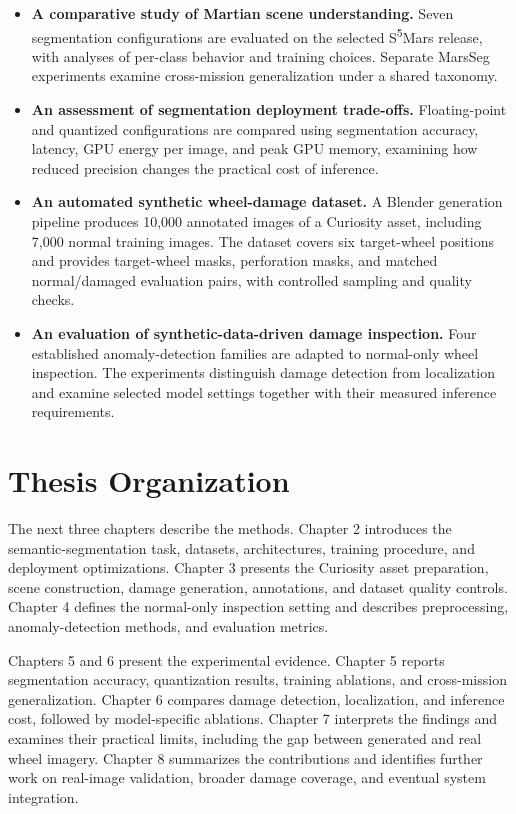 \begin{itemize}
    \item \textbf{A comparative study of Martian scene understanding.} Seven segmentation configurations are evaluated on the selected S\textsuperscript{5}Mars release, with analyses of per-class behavior and training choices. Separate MarsSeg experiments examine cross-mission generalization under a shared taxonomy.
    \item \textbf{An assessment of segmentation deployment trade-offs.} Floating-point and quantized configurations are compared using segmentation accuracy, latency, GPU energy per image, and peak GPU memory, examining how reduced precision changes the practical cost of inference.
    \item \textbf{An automated synthetic wheel-damage dataset.} A Blender generation pipeline produces 10,000 annotated images of a Curiosity asset, including 7,000 normal training images. The dataset covers six target-wheel positions and provides target-wheel masks, perforation masks, and matched normal/damaged evaluation pairs, with controlled sampling and quality checks.
    \item \textbf{An evaluation of synthetic-data-driven damage inspection.} Four established anomaly-detection families are adapted to normal-only wheel inspection. The experiments distinguish damage detection from localization and examine selected model settings together with their measured inference requirements.
\end{itemize}

\section{Thesis Organization}

The next three chapters describe the methods. Chapter 2  introduces the semantic-segmentation task, datasets, architectures, training procedure, and deployment optimizations. Chapter 3 presents the Curiosity asset preparation, scene construction, damage generation, annotations, and dataset quality controls. Chapter 4 defines the normal-only inspection setting and describes preprocessing, anomaly-detection methods, and evaluation metrics.

Chapters 5 and 6 present the experimental evidence. Chapter 5 reports segmentation accuracy, quantization results, training ablations, and cross-mission generalization. Chapter 6 compares damage detection, localization, and inference cost, followed by model-specific ablations. Chapter 7 interprets the findings and examines their practical limits, including the gap between generated and real wheel imagery. Chapter 8 summarizes the contributions and identifies further work on real-image validation, broader damage coverage, and eventual system integration.
